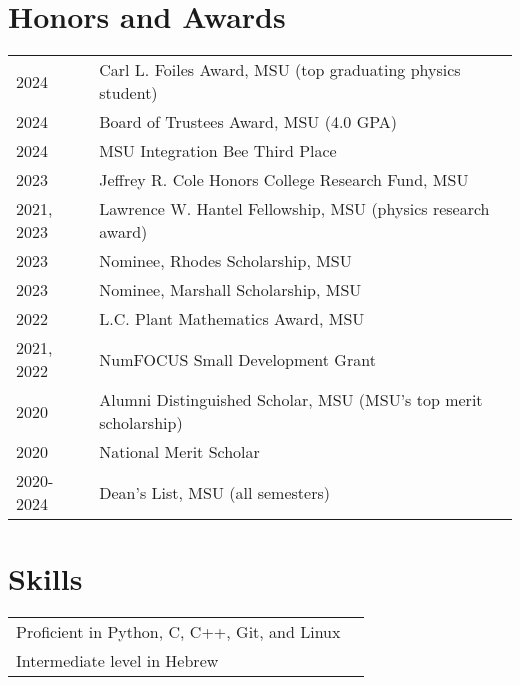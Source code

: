 \documentclass[letterpaper,12pt]{article}
\begin{document}
\section{Honors and Awards}

\begin{tabularx}{\linewidth}{@{}l X@{}}	
2024 & Carl L. Foiles Award, MSU (top graduating physics student) \\
2024 & Board of Trustees Award, MSU (4.0 GPA) \\
2024 & MSU Integration Bee Third Place \\
2023 & Jeffrey R. Cole Honors College Research Fund, MSU \\
2021, 2023 & Lawrence W. Hantel Fellowship, MSU (physics research award) \\
2023 & Nominee, Rhodes Scholarship, MSU \\
2023 & Nominee, Marshall Scholarship, MSU \\
2022 & L.C. Plant Mathematics Award, MSU \\
2021, 2022 & NumFOCUS Small Development Grant \\
2020 & Alumni Distinguished Scholar, MSU (MSU's top merit scholarship) \\
2020 & National Merit Scholar \\
2020-2024 & Dean's List, MSU (all semesters) \\
\end{tabularx}


\section{Skills}

\begin{tabularx}{\linewidth}{@{}l X@{}}
Proficient in Python, C, C++, Git, and Linux \\
Intermediate level in Hebrew \\  
\end{tabularx}

\vfill
{}
\end{document}
